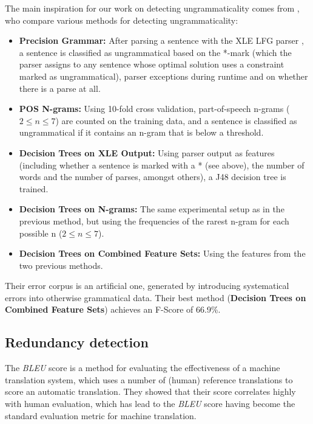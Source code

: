 \documentclass[a4paper,10pt]{scrartcl}
\theoremstyle{style}
\begin{document}
The main inspiration for our work on detecting ungrammaticality comes from \cite{wagner2007comparative}, who compare various methods for detecting ungrammaticality:

\begin{itemize}
	\item \textbf{Precision Grammar:} After parsing a sentence with the XLE LFG parser \citep{maxwell1996efficient}, a sentence is classified as ungrammatical based on the *-mark (which the parser assigns to any sentence whose optimal solution uses a constraint marked as ungrammatical), parser exceptions during runtime and on whether there is a parse at all.
	\item \textbf{POS N-grams:} Using 10-fold cross validation, part-of-speech n-grams ($2 \leq n \leq 7$) are counted on the training data, and a sentence is classified as ungrammatical if it contains an n-gram that is below a threshold.
	\item \textbf{Decision Trees on XLE Output:} Using parser output as features (including whether a sentence is marked with a * (see above), the number of words and the number of parses, amongst others), a J48 decision tree is trained.
	\item \textbf{Decision Trees on N-grams:} The same experimental setup as in the previous method, but using the frequencies of the rarest n-gram for each possible n ($2 \leq n \leq 7$).
	\item \textbf{Decision Trees on Combined Feature Sets:} Using the features from the two previous methods.
\end{itemize}

Their error corpus is an artificial one, generated by introducing systematical errors into otherwise grammatical data. Their best method (\textbf{Decision Trees on Combined Feature Sets}) achieves an F-Score of 66.9\%.


\subsection{Redundancy detection}

The \textit{BLEU} score \citep{papineni2002bleu} is a method for evaluating the effectiveness of a machine translation system, which uses a number of (human) reference translations to score an automatic translation. They showed that their score correlates highly with human evaluation, which has lead to the \textit{BLEU} score having become the standard evaluation metric for machine translation.
\end{document}
